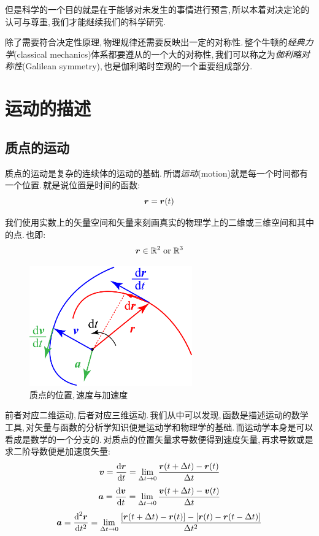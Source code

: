 但是科学的一个目的就是在于能够对未发生的事情进行预言,\,所以本着对决定论的认可与尊重,\,我们才能继续我们的科学研究.

\vspace{1cm}

除了需要符合决定性原理,\,物理规律还需要反映出一定的对称性.\,整个牛顿的\emph{经典力学}(classical mechanics)体系都要遵从的一个大的对称性,\,我们可以称之为\emph{伽利略对称性}(Galilean symmetry),\,也是伽利略时空观的一个重要组成部分.\,



\section{运动的描述}

\subsection{质点的运动}
质点的运动是复杂的连续体的运动的基础.\,所谓\emph{运动}(motion)就是每一个时间都有一个位置.\,就是说位置是时间的函数:
\[\boldsymbol{r}=\boldsymbol{r}(t)\]

我们使用实数上的矢量空间和矢量来刻画真实的物理学上的二维或三维空间和其中的点.\,也即:
\[\boldsymbol{r}\in\mathbb{R}^2 \;{\rm or}\; \mathbb{R}^3\]

\begin{figure}\label{6-1-3}
\vspace{-0.4cm}
\centering
\includegraphics[width=7cm]{image/6-1-3.png}
\caption{质点的位置,\,速度与加速度}
\end{figure}
前者对应二维运动,\,后者对应三维运动.\,我们从中可以发现,\,函数是描述运动的数学工具,\,对矢量与函数的分析学知识便是运动学和物理学的基础.\,而运动学本身是可以看成是数学的一个分支的.\,对质点的位置矢量求导数便得到速度矢量,\,再求导数或是求二阶导数便是加速度矢量:
\[\boldsymbol{v}=\frac{\textrm{d} \boldsymbol{r}}{\textrm{d} t}=\lim_{\Delta t\to 0 }\frac{\boldsymbol{r}(t+\Delta t)-\boldsymbol{r}(t)}{\Delta t}\]
\[\boldsymbol{a}=\frac{\textrm{d} \boldsymbol{v}}{\textrm{d} t}=\lim_{\Delta t\to 0 }\frac{\boldsymbol{v}(t+\Delta t)-\boldsymbol{v}(t)}{\Delta t}\]
\[\boldsymbol{a}=\frac{\textrm{d} ^2\boldsymbol{r}}{\textrm{d} t^2}=\lim_{\Delta t\to 0 }\frac{[\boldsymbol{r}(t+\Delta t)-\boldsymbol{r}(t)]-[\boldsymbol{r}(t)-\boldsymbol{r}(t-\Delta t)]}{\Delta t^2}\]

